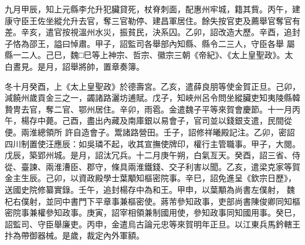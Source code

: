 \begin{pinyinscope}
 九月甲辰，知上元縣李允升犯臟貸死，杖脊刺面，配惠州牢城，籍其貲。丙午，建康守臣王佐坐縱允升去官，奪三官勒停、建昌軍居住。餘失按官吏及薦舉官奪官有差。辛亥，遣官按視溫州水災，振貧民，決系囚。乙卯，詔改造大歷。辛酉，追封子恪為邵王，謚曰悼肅。甲子，詔監司各舉部內知縣、縣令二三人，守臣各舉
 屬縣一二人。己巳，魏□巳等上神宗、哲宗、徽宗三朝《帝紀》、《太上皇聖政》。太白晝見。是月，詔舉將帥，置章奏簿。



 冬十月癸酉，上《太上皇聖政》於德壽宮。乙亥，遣薛良朋等使金賀正旦。己卯，減饒州歲貢金三之一，蠲諸路灑坊逋賦。戊子，知峽州呂令問坐縱臟吏知夷陵縣韓贄冑去官，奪二官、鄂州居住。辛卯，雨雹。金遣魏子平等來賀會慶節。十一月丙午，楊存中薨。己酉，盡出內藏及南庫銀以易會子，官司並以錢銀支遣，民間從便。兩淮總領所
 許自造會子。鬻諸路營田。壬子，詔修祥曦殿記注。乙卯，密詔四川制置使汪應辰：如吳璘不起，收其宣撫使牌印，權行主管職事。甲子，大閱。戊辰，築郢州城。是月，詔汰冗兵。十二月庚午朔，白氣亙天。癸酉，詔三省、侍從、臺諫、兩淮漕臣、郡守，條具兩淮鐵錢、交子利害以聞。乙亥，遣梁克家等賀金主生辰。己卯，以資政殿學士葉顒知樞密院事。辛巳，詔免進呈《欽宗日歷》，送國史院修纂實錄。壬午，追封楊存中為和王。甲申，以葉顒為尚書左僕射，
 魏杞右僕射，並同中書門下平章事兼樞密使。蔣芾參知政事，吏部尚書陳俊卿同知樞密院事兼權參知政事。庚寅，詔宰相領兼制國用使，參知政事同知國用事。癸巳，詔監司、守臣舉廉吏。丙申，金遣烏古論元忠等來賀明年正旦。以江東兵馬鈐轄王抃為帶御器械。是歲，裁定內外軍額。



\end{pinyinscope}